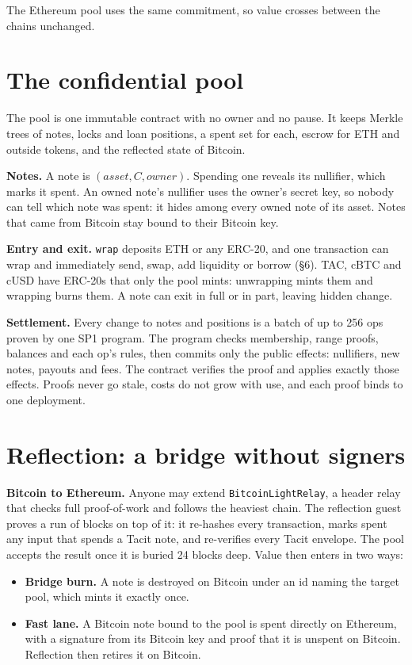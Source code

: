 \documentclass[11pt,letterpaper]{article}
\newcommand{\op}[1]{\texttt{#1}}
\begin{document}
The Ethereum pool uses the same commitment, so value crosses between the chains unchanged.

\section{The confidential pool}

The pool is one immutable contract with no owner and no pause. It keeps Merkle trees of notes, locks and
loan positions, a spent set for each, escrow for ETH and outside tokens, and the reflected state of
Bitcoin.

\textbf{Notes.} A note is $(\mathit{asset}, C, \mathit{owner})$. Spending one reveals its nullifier, which
marks it spent. An owned note's nullifier uses the owner's secret key, so nobody can tell which note was
spent: it hides among every owned note of its asset. Notes that came from Bitcoin stay bound to their
Bitcoin key.

\textbf{Entry and exit.} \op{wrap} deposits ETH or any ERC-20, and one transaction can wrap and immediately send,
swap, add liquidity or borrow (\S6). TAC, cBTC and cUSD have ERC-20s that only the pool mints:
unwrapping mints them and wrapping burns them. A note can exit in full or in part, leaving hidden change.

\textbf{Settlement.} Every change to notes and positions is a batch of up to 256 ops proven by one SP1
program. The program checks membership, range proofs, balances and each op's rules, then commits only the
public effects: nullifiers, new notes, payouts and fees. The contract verifies the proof and applies
exactly those effects. Proofs never go stale, costs do not grow with use, and each proof binds to one
deployment.

\section{Reflection: a bridge without signers}

\textbf{Bitcoin to Ethereum.} Anyone may extend \op{BitcoinLightRelay}, a header relay that checks full
proof-of-work and follows the heaviest chain. The reflection guest proves a run of blocks on top of it:
it re-hashes every transaction, marks spent any input that spends a Tacit note, and re-verifies every
Tacit envelope. The pool accepts the result once it is buried 24 blocks deep. Value then enters in two
ways:

\begin{itemize}
\item \textbf{Bridge burn.} A note is destroyed on Bitcoin under an id naming the target pool, which mints it
  exactly once.
\item \textbf{Fast lane.} A Bitcoin note bound to the pool is spent directly on Ethereum, with a signature from its
  Bitcoin key and proof that it is unspent on Bitcoin. Reflection then retires it on Bitcoin.
\end{itemize}
\end{document}

